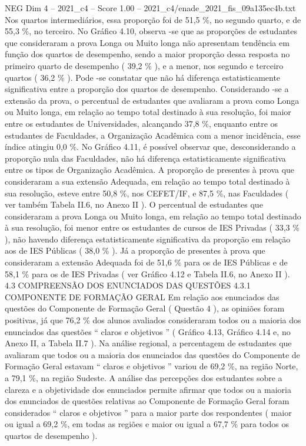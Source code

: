 \begin{textsample}{NEG Dim 4 – 2021\_c4 – Score 1.00 – 2021\_c4/enade\_2021\_fis\_09a135ec4b.txt}
Nos quartos intermediários, essa proporção foi de 51,5 \%, no segundo quarto, e de 55,3 \%, no terceiro.
No Gráfico 4.10, observa -se que as proporções de estudantes que consideraram a prova Longa ou Muito longa não apresentam tendência em função dos quartos de desempenho, sendo a maior proporção dessa resposta no primeiro quarto de desempenho ( 39,2 \% ), e a menor, nos segundo e terceiro quartos ( 36,2 \% ).
Pode -se constatar que não há diferença estatisticamente significativa entre a proporção dos quartos de desempenho.
Considerando -se a extensão da prova, o percentual de estudantes que avaliaram a prova como Longa ou Muito longa, em relação ao tempo total destinado à sua resolução, foi maior entre os estudantes de Universidades, alcançando 37,8 \%, enquanto entre os estudantes de Faculdades, a Organização Acadêmica com a menor incidência, esse índice atingiu 0,0 \%.
No Gráfico 4.11, é possível observar que, desconsiderando a proporção nula das Faculdades, não há diferença estatisticamente significativa entre os tipos de Organização Acadêmica.
A proporção de presentes à prova que consideraram a sua extensão Adequada, em relação ao tempo total destinado à sua resolução, esteve entre 50,8 \%, nos CEFET/IF, e 87,5 \%, nas Faculdades ( ver também Tabela II.6, no Anexo II ).
O percentual de estudantes que consideraram a prova Longa ou Muito longa, em relação ao tempo total destinado à sua resolução, foi menor entre os estudantes de cursos de IES Privadas ( 33,3 \% ), não havendo diferença estatisticamente significativa da proporção em relação aos de IES Públicas ( 38,0 \% ).
Já a proporção de presentes à prova que consideraram a extensão Adequada foi de 51,6 \% para os de IES Públicas e de 58,1 \% para os de IES Privadas ( ver Gráfico 4.12 e Tabela II.6, no Anexo II ). 4.3 COMPREENSÃO DOS ENUNCIADOS DAS QUESTÕES 4.3.1 COMPONENTE DE FORMAÇÃO GERAL Em relação aos enunciados das questões do Componente de Formação Geral ( Questão 4 ), as opiniões foram positivas, já que 76,2 \% dos alunos avaliados consideraram todos ou a maioria dos enunciados das questões “ claros e objetivos ” ( Gráfico 4.13, Gráfico 4.14 e, no Anexo II, a Tabela II.7 ).
Na análise regional, a percentagem de estudantes que avaliaram que todos ou a maioria dos enunciados das questões do Componente de Formação Geral estavam “ claros e objetivos ” variou de 69,2 \%, na região Norte, a 79,1 \%, na região Sudeste.
A análise das percepções dos estudantes sobre a clareza e a objetividade dos enunciados permite afirmar que todos ou a maioria dos enunciados de questões relativas ao Componente de Formação Geral foram considerados “ claros e objetivos ” para a maior parte dos respondentes ( maior ou igual a 69,2 \%, em todas as regiões e maior ou igual a 67,7 \% para todos os quartos de desempenho ).

\end{textsample}
